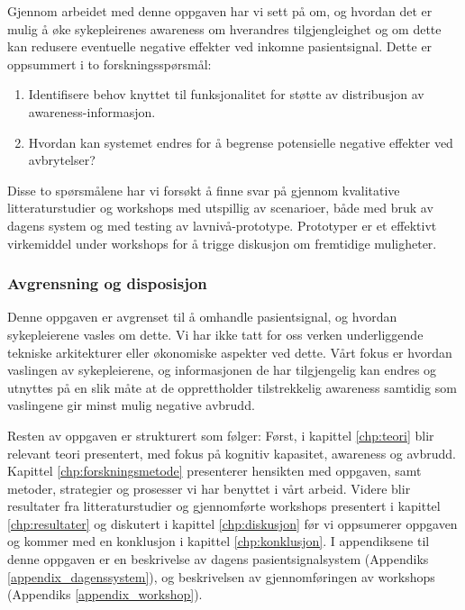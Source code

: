 \noindent
Gjennom arbeidet med denne oppgaven har vi sett på om, og hvordan det er mulig å øke sykepleirenes awareness om hverandres tilgjengleighet og om dette kan redusere eventuelle negative effekter ved inkomne pasientsignal. Dette er oppsummert i to forskningsspørsmål:

\begin{enumerate}
  \item Identifisere behov knyttet til funksjonalitet for støtte av distribusjon av awareness-informasjon.
  \item Hvordan kan systemet endres for å begrense potensielle negative effekter ved avbrytelser?
\end{enumerate}

\noindent
Disse to spørsmålene har vi forsøkt å finne svar på gjennom kvalitative litteraturstudier og workshops med utspillig av scenarioer, både med bruk av dagens system og med testing av lavnivå-prototype. Prototyper er et effektivt virkemiddel under workshops for å trigge diskusjon om fremtidige muligheter. 

\subsubsection{Avgrensning og disposisjon}
Denne oppgaven er avgrenset til å omhandle pasientsignal, og hvordan sykepleierene vasles om dette. Vi har ikke tatt for oss verken underliggende tekniske arkitekturer eller økonomiske aspekter ved dette. Vårt fokus er hvordan vaslingen av sykepleierene, og informasjonen de har tilgjengelig kan endres og utnyttes på en slik måte at de opprettholder tilstrekkelig awareness samtidig som vaslingene gir minst mulig negative avbrudd.

\noindent
Resten av oppgaven er strukturert som følger: Først, i kapittel \ref{chp:teori} blir relevant teori presentert, med fokus på kognitiv kapasitet, awareness og avbrudd. Kapittel \ref{chp:forskningsmetode} presenterer hensikten med oppgaven, samt metoder, strategier og prosesser vi har benyttet i vårt arbeid. Videre blir resultater fra litteraturstudier og gjennomførte workshops presentert i kapittel \ref{chp:resultater} og diskutert i kapittel \ref{chp:diskusjon} før vi oppsumerer oppgaven og kommer med en konklusjon i kapittel \ref{chp:konklusjon}. I appendiksene til denne oppgaven er en beskrivelse av dagens pasientsignalsystem (Appendiks \ref{appendix_dagenssystem}), og beskrivelsen av gjennomføringen av workshops (Appendiks \ref{appendix_workshop}).